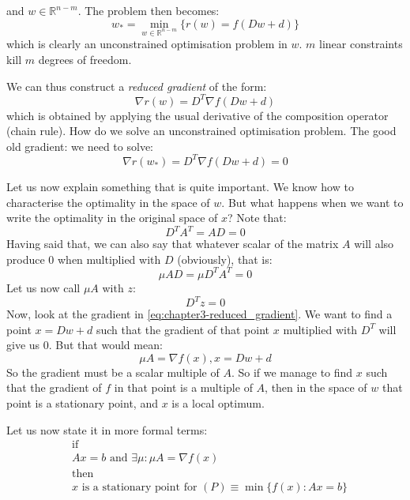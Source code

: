 and $w \in \mathbb{R}^{n-m}$. The problem then becomes:
\begin{equation}
    w_* = \min_{w \in \mathbb{R}^{n-m}} \{r(w) = f(Dw + d)\}
\end{equation}
which is clearly an unconstrained optimisation problem in $w$. $m$ linear constraints kill $m$ degrees of freedom.
\par We can thus construct a \textit{reduced gradient} of the form:
\begin{equation}
    \nabla r(w) = D^T \nabla f (Dw + d)
\end{equation}
which is obtained by applying the usual derivative of the composition operator (chain rule). How do we solve an unconstrained optimisation problem. The good old gradient: we need to solve:
\begin{equation}
    \nabla r(w_*) = D^T \nabla f (Dw + d) = 0
    \label{eq:chapter3-reduced_gradient}
\end{equation}
\par Let us now explain something that is quite important. We know how to characterise the optimality in the space of $w$. But what happens when we want to write the optimality in the original space of $x$? Note that:
\begin{equation}
    D^T A^T = AD = 0
\end{equation}
Having said that, we can also say that whatever scalar of the matrix $A$ will also produce 0 when multiplied with $D$ (obviously), that is:
\begin{equation}
    \mu AD = \mu D^T A^T = 0
\end{equation}
Let us now call $\mu A$ with $z$:
\begin{equation}
    D^T z = 0
\end{equation}
Now, look at the gradient in \ref{eq:chapter3-reduced_gradient}. We want to find a point $x = Dw + d$ such that the gradient of that point $x$ multiplied with $D^T$ will give us 0. But that would mean:
\begin{equation}
    \mu A = \nabla f(x), x=Dw + d
\end{equation}
So the gradient must be a scalar multiple of $A$. So if we manage to find $x$ such that the gradient of $f$ in that point is a multiple of $A$, then in the space of $w$ that point is a stationary point, and $x$ is a local optimum.
\par Let us now state it in more formal terms:
\begin{equation}
\begin{split}
    &\mbox{if}\\
    &Ax = b \mbox{ and } \exists \mu : \mu A = \nabla f(x)\\
    &\mbox{then}\\
    &x \mbox{ is a stationary point for } (P) \equiv \min \{f(x) : Ax = b\}
\end{split}
\end{equation}
